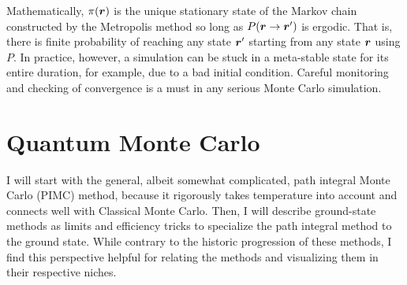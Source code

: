 Mathematically, $\pi(\boldsymbol{r})$ is the unique stationary state of the Markov chain constructed by the Metropolis method so long as $P(\boldsymbol{r}\rightarrow\boldsymbol{r}')$ is ergodic. That is, there is finite probability of reaching any state $\boldsymbol{r}'$ starting from any state $\boldsymbol{r}$ using $P$.
In practice, however, a simulation can be stuck in a meta-stable state for its entire duration, for example, due to a bad initial condition. Careful monitoring and checking of convergence is a must in any serious Monte Carlo simulation.

\section{Quantum Monte Carlo}

I will start with the general, albeit somewhat complicated, path integral Monte Carlo (PIMC) method, because it rigorously takes temperature into account and connects well with Classical Monte Carlo. Then, I will describe ground-state methods as limits and efficiency tricks to specialize the path integral method to the ground state. While contrary to the historic progression of these methods, I find this perspective helpful for relating the methods and visualizing them in their respective niches.


